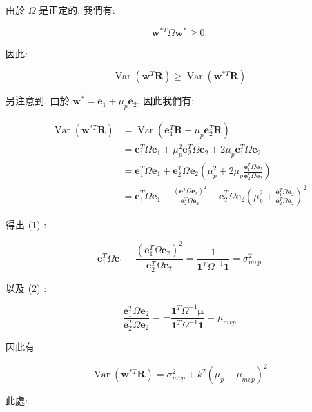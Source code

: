 \documentclass[letterpaper]{article}
\begin{document}
		由於 $\Omega$ 是正定的, 我們有: 
		
		$$
		\mathbf{w}^{* T} \Omega \mathbf{w}^{*} \geq 0 .
		$$
		
		因此: 
		
		$$
		\operatorname{Var}\left (\mathbf{w}^{T} \mathbf{R}\right) \geq \operatorname{Var}\left (\mathbf{w}^{* T} \mathbf{R}\right) 
		$$
		
		另注意到, 由於 $\mathbf{w}^{*} = \mathbf{e}_{1} + \mu_{p} \mathbf{e}_{2}$, 因此我們有: 
		
		$$
		\begin{aligned}
			\operatorname{Var}\left (\mathbf{w}^{* T} \mathbf{R}\right) & =\operatorname{Var}\left (\mathbf{e}_{1}^{T} \mathbf{R}+\mu_{p} \mathbf{e}_{2}^{T} \mathbf{R}\right) \\
			& =\mathbf{e}_{1}^{T} \Omega \mathbf{e}_{1}+\mu_{p}^{2} \mathbf{e}_{2}^{T} \Omega \mathbf{e}_{2}+2 \mu_{p} \mathbf{e}_{1}^{T} \Omega \mathbf{e}_{2} \\
			& =\mathbf{e}_{1}^{T} \Omega \mathbf{e}_{1}+\mathbf{e}_{2}^{T} \Omega \mathbf{e}_{2}\left (\mu_{p}^{2}+2 \mu_{p} \frac{\mathbf{e}_{1}^{T} \Omega \mathbf{e}_{2}}{\mathbf{e}_{2}^{T} \Omega \mathbf{e}_{2}}\right) \\
			& =\mathbf{e}_{1}^{T} \Omega \mathbf{e}_{1}-\frac{\left (\mathbf{e}_{1}^{T} \Omega \mathbf{e}_{2}\right) ^{2}}{\mathbf{e}_{2}^{T} \Omega \mathbf{e}_{2}}+\mathbf{e}_{2}^{T} \Omega \mathbf{e}_{2}\left (\mu_{p}^{2}+\frac{\mathbf{e}_{1}^{T} \Omega \mathbf{e}_{2}}{\mathbf{e}_{2}^{T} \Omega \mathbf{e}_{2}}\right) ^{2}
		\end{aligned}
		$$
		
		得出 (1) : 
		
		$$
		\mathbf{e}_{1}^{T} \Omega \mathbf{e}_{1}-\frac{\left (\mathbf{e}_{1}^{T} \Omega \mathbf{e}_{2}\right) ^{2}}{\mathbf{e}_{2}^{T} \Omega \mathbf{e}_{2}}=\frac{1}{\mathbf{1}^{T} \Omega^{-1} \mathbf{1}}=\sigma_{m v p}^{2}
		$$
		
		以及 (2) : 
		
		$$
		\frac{\mathbf{e}_{1}^{T} \Omega \mathbf{e}_{2}}{\mathbf{e}_{2}^{T} \Omega \mathbf{e}_{2}}=-\frac{\mathbf{1}^{T} \Omega^{-1} \boldsymbol{\mu}}{\mathbf{1}^{T} \Omega^{-1} \mathbf{1}}=\mu_{m v p}
		$$
		
		因此有
		
		$$
		\operatorname{Var}\left (\mathbf{w}^{* T} \mathbf{R}\right) =\sigma_{m v p}^{2}+k^{2}\left (\mu_{p}-\mu_{m v p}\right) ^{2}
		$$
		
		此處: 
		
\end{document}
